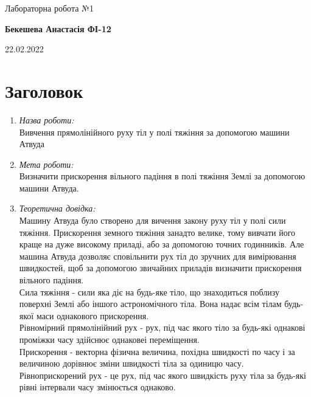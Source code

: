 \documentclass[a4paper,12pt]{article}
\begin{document}
\begin{center}
\begin{titlepage}
   \begin{center}
       \vspace*{1cm}



       \vspace{0.5cm}
        {\LARGE Лабораторна робота №1}
            
       \vspace{1.5cm}

       \textbf{Бекешева Анастасія ФІ-12}

       \vfill
            
       \vspace{0.8cm}
            
       22.02.2022
            
   \end{center}
\end{titlepage}

\tableofcontents
\newpage 
\end{center}
\section{Заголовок}
\begin{enumerate}
	\item \emph{Назва роботи:} \\\indent Вивчення прямолінійного руху тіл у полі тяжіння за допомогою машини Атвуда
	\item \emph{Мета роботи:}\\ \indent Визначити прискорення вільного падіння в полі тяжіння Землі за допомогою машини Атвуда.
	\item \emph{Теоретична довідка:}\\  \indent Машину Атвуда було створено для вичення закону руху тіл у полі сили тяжіння. Прискорення земного тяжіння занадто велике, тому вивчати його краще на дуже високому приладі, або за допомогою точних годинників. Але машина Атвуда дозволяє сповільнити рух тіл до зручних для вимірювання швидкостей, щоб за допомогою звичайних приладів визначити прискорення вільного падіння. \\
	\indent Сила тяжіння  - сили яка діє на будь-яке тіло, що знаходиться поблизу поверхні Землі або іншого астрономічного тіла. Вона надає всім тілам будь-якої маси однакового прискорення.\\
	\indent  Рівномірний прямолінійний рух -  рух, під час якого тіло за будь-які однакові проміжки часу здійснює однаковеі переміщення. \\
	 \indent Прискорення - векторна фізична величина, похідна швидкості по часу і за величиною дорівнює зміни швидкості тіла за одиницю часу. \\
	 \indent Рівноприскорений рух - це рух, під час якого швидкість руху тіла за будь-які рівні інтервали часу змінюється однаково. \\
	 

\end{enumerate}
\end{document}

